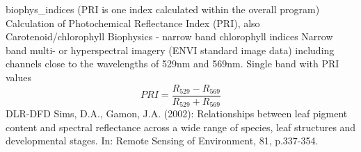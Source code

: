 %
{ %
biophys\_indices (PRI is one index calculated within the overall program)
}
%
{ %
Calculation of Photochemical Reflectance Index (PRI), also Carotenoid/chlorophyll
}
%
{ %
Biophysics - narrow band chlorophyll indices
}
%
{ %
Narrow band multi- or hyperspectral imagery (ENVI standard image data) including channels close to the wavelengths of 529nm and 569nm.\bigskip
}
%
{ %
Single band with PRI values
}
%
{ %
\begin{displaymath}
PRI = \frac{R_{529} -R_{569} } {R_{529} +R_{569} }
\end{displaymath}
}
%
{ %
DLR-DFD
}
%
{ %
Sims, D.A., Gamon, J.A. (2002): Relationships between leaf pigment content and spectral reflectance across a wide range of species, leaf structures and developmental stages. In: Remote Sensing of Environment, 81, p.337-354.
}
